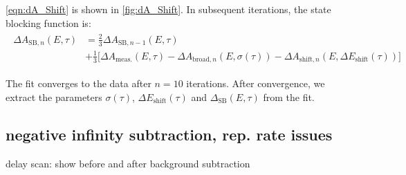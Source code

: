 
\cref{eqn:dA_Shift} is shown in \cref{fig:dA_Shift}. In subsequent iterations, the state blocking function is:
\begin{align}
\begin{split}
\Delta A_{\textrm{SB},n}(E,\tau) &= \frac{2}{3} \Delta A_{\textrm{SB},n-1}(E,\tau) \\
&+ \frac{1}{3} \Big[ \Delta A_{\textrm{meas.}}(E,\tau) - \Delta A_{\textrm{broad},n}(E, \sigma(\tau))- \Delta A_{\textrm{shift},n}(E,\Delta E_{\textrm{shift}}(\tau)) \Big]
\end{split}
\end{align}

The fit converges to the data after $n=10$ iterations. After convergence, we extract the parameters $\sigma(\tau)$, $\Delta E_{\textrm{shift}}(\tau)$ and $\Delta_{\textrm{SB}}(E,\tau)$ from the fit.

\subsection{negative infinity subtraction, rep. rate issues}

delay scan: show before and after background subtraction

